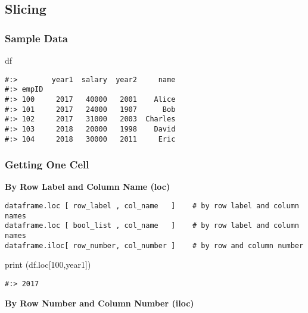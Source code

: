 \documentclass[
]{book}
\newenvironment{Shaded}{\begin{snugshade}}{\end{snugshade}}
\newcommand{\BuiltInTok}[1]{#1}
\newcommand{\DecValTok}[1]{\textcolor[rgb]{0.06,0.06,0.06}{#1}}
\newcommand{\NormalTok}[1]{#1}
\newcommand{\StringTok}[1]{\textcolor[rgb]{0.5,0.5,0.5}{#1}}
\begin{document}
\hypertarget{slicing}{%
\subsection{Slicing}\label{slicing}}

\hypertarget{sample-data-10}{%
\subsubsection{Sample Data}\label{sample-data-10}}

\begin{Shaded}
\begin{Highlighting}[]
\NormalTok{df}
\end{Highlighting}
\end{Shaded}

\begin{verbatim}
#:>        year1  salary  year2     name
#:> empID                               
#:> 100     2017   40000   2001    Alice
#:> 101     2017   24000   1907      Bob
#:> 102     2017   31000   2003  Charles
#:> 103     2018   20000   1998    David
#:> 104     2018   30000   2011     Eric
\end{verbatim}

\hypertarget{getting-one-cell}{%
\subsubsection{Getting One Cell}\label{getting-one-cell}}

\textbf{By Row Label and Column Name (loc)}

\begin{verbatim}
dataframe.loc [ row_label , col_name   ]    # by row label and column names
dataframe.loc [ bool_list , col_name   ]    # by row label and column names
dataframe.iloc[ row_number, col_number ]    # by row and column number
\end{verbatim}

\begin{Shaded}
\begin{Highlighting}[]
\BuiltInTok{print}\NormalTok{ (df.loc[}\DecValTok{100}\NormalTok{,}\StringTok{\textquotesingle{}year1\textquotesingle{}}\NormalTok{])}
\end{Highlighting}
\end{Shaded}

\begin{verbatim}
#:> 2017
\end{verbatim}

\textbf{By Row Number and Column Number (iloc)}
\end{document}
